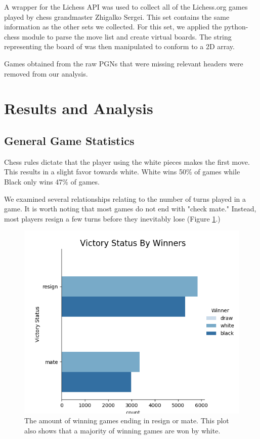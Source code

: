 \documentclass[reprint,
 amsmath,amssymb,nobibnotes,
 aps, floatfix]{revtex4-1}
\begin{document}
A wrapper for the Lichess API was used to collect all of the Lichess.org games played by chess grandmaster Zhigalko Sergei. This set contains the same information as the other sets we collected. For this set, we applied the python-chess module to parse the move list and create virtual boards. The string representing the board of was then manipulated to conform to a 2D array.

Games obtained from the raw PGNs that were missing relevant headers were removed from our analysis.
\section{\label{sec:level3}Results and Analysis}
\subsection{General Game Statistics}
Chess rules dictate that the player using the white pieces makes the first move. This results in a slight favor towards white. White wins 50\% of games while Black only wins 47\% of games.

We examined several relationships relating to the number of turns played in a game. It is worth noting that most games do not end with "check mate." Instead, most players resign a few turns before they inevitably lose (Figure \ref{fig:resign}.) 

\begin{figure}
    \centering
    \includegraphics[scale=.5]{image1.png}
    \caption{The amount of winning games ending in resign or mate. This plot also shows that a majority of winning games are won by white.}
    \label{fig:resign}
\end{figure}
\end{document}
